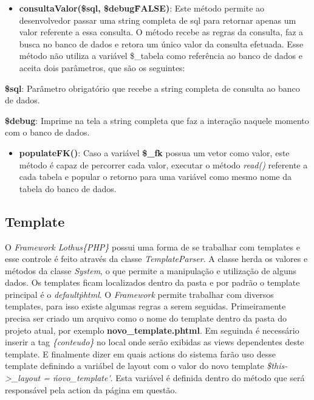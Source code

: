                 \begin{itemize}

                \item\textbf{consultaValor(\$sql, \$debug\=FALSE)}: Este método permite ao desenvolvedor passar uma string completa de sql para retornar apenas um valor referente a essa consulta. O método recebe as regras da consulta, faz a busca no banco de dados e retora um único valor da consulta efetuada. Esse método não utiliza a variável \$\_tabela como referência ao banco de dados e aceita dois parâmetros, que são os seguintes:
                \end{itemize}
                    \item\textbf{\$sql}: Parâmetro obrigatório que recebe a string completa de consulta ao banco de dados.
                    \item\textbf{\$debug}: Imprime na tela a string completa que faz a interação naquele momento com o banco de dados.
                \begin{itemize}

                \item\textbf{populateFK()}: Caso a variável \textbf{\$\_fk} possua um vetor como valor, este método é capaz de percorrer cada valor, executar o método \emph{read()} referente a cada tabela e popular o retorno para uma variável como mesmo nome da tabela do banco de dados.

            \end{itemize}

        \subsection{Template\label{sub:system-template}}

            O \emph{Framework Lothus\{PHP\}} possui uma forma de se trabalhar com templates e esse controle é feito através da classe \emph{TemplateParser}. A classe herda os valores e métodos da classe \emph{System}, o que permite a manipulação e utilização de alguns dados. Os templates ficam localizados dentro da pasta  e por padrão o template principal é o \emph{default\.phtml}. O \emph{Framework} permite trabalhar com diversos templates, para isso existe algumas regras a serem seguidas. Primeiramente precisa ser criado um arquivo como o nome do template dentro da pasta  do projeto atual, por exemplo \textbf{novo\_template.phtml}. Em seguinda é necessário inserir a tag \emph{\{conteudo\}} no local onde serão exibidas as views dependentes deste template. E finalmente dizer em quais actions do sistema farão uso desse template definindo a variábel de layout com o valor do novo template \emph{\$this->\_layout = \'novo\_template\'}. Esta variável é definida dentro do método que será responsável pela action da página em questão.

